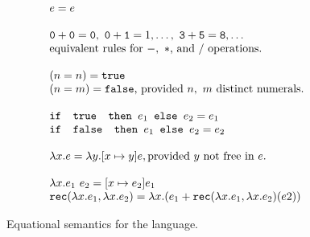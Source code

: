 \begin{figure}
\[
\begin{array}{lr}
e = e \\ \\
\texttt{0} + \texttt{0} = \texttt{0}, \ \texttt{0} + \texttt{1} = 1, \ldots, \ \texttt{3} + \texttt{5} = \texttt{8}, \ldots  \\
\text{equivalent rules for } -, \ * \text{, and } /\text{ operations.}
\\ \\
(n =n) = \texttt{true} \\ (n=m) = \texttt{false}\text{, provided } n, \ m \text{ distinct numerals.}\\ \\ 
\ifelse{\texttt{ true }}{e_1}{e_2} = e_1 \\
\ifelse{\texttt{ false }}{e_1}{e_2} = e_2 \\ \\ 
\lambda x.e = \lambda y.[x \mapsto y]e, \text{provided } y \text{ not free in } e. \\ \\ 
\lambda x.e_1 \ e_2 = [x \mapsto e_2]e_1 \\
\texttt{rec}(\lambda x.e_1, \lambda x.e_2) = 
			\lambda x.(e_1 + \texttt{rec}(\lambda x.e_1, \lambda x.e_2)(e2)) 
\end{array}
\]
\caption{Equational semantics for the language.}
\label{fig:eqsem}
\end{figure}

